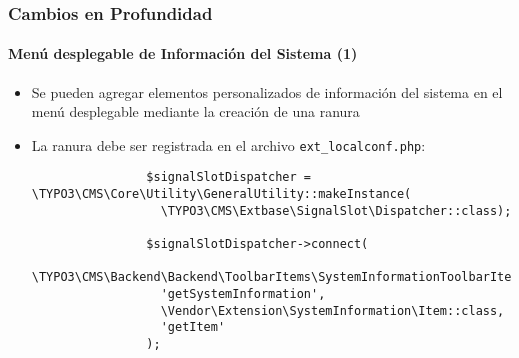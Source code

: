 \begin{frame}[fragile]
	\frametitle{Cambios en Profundidad}
	\framesubtitle{Menú desplegable de Información del Sistema (1)}

	\lstset{basicstyle=\tiny\ttfamily}

	\begin{itemize}
		\item Se pueden agregar elementos personalizados de información del sistema
			en el menú desplegable mediante la creación de una ranura

		\item La ranura debe ser registrada en el archivo  \texttt{ext\_localconf.php}:

			\begin{lstlisting}
				$signalSlotDispatcher = \TYPO3\CMS\Core\Utility\GeneralUtility::makeInstance(
				  \TYPO3\CMS\Extbase\SignalSlot\Dispatcher::class);

				$signalSlotDispatcher->connect(
				  \TYPO3\CMS\Backend\Backend\ToolbarItems\SystemInformationToolbarItem::class,
				  'getSystemInformation',
				  \Vendor\Extension\SystemInformation\Item::class,
				  'getItem'
				);
			\end{lstlisting}

	\end{itemize}

\end{frame}

